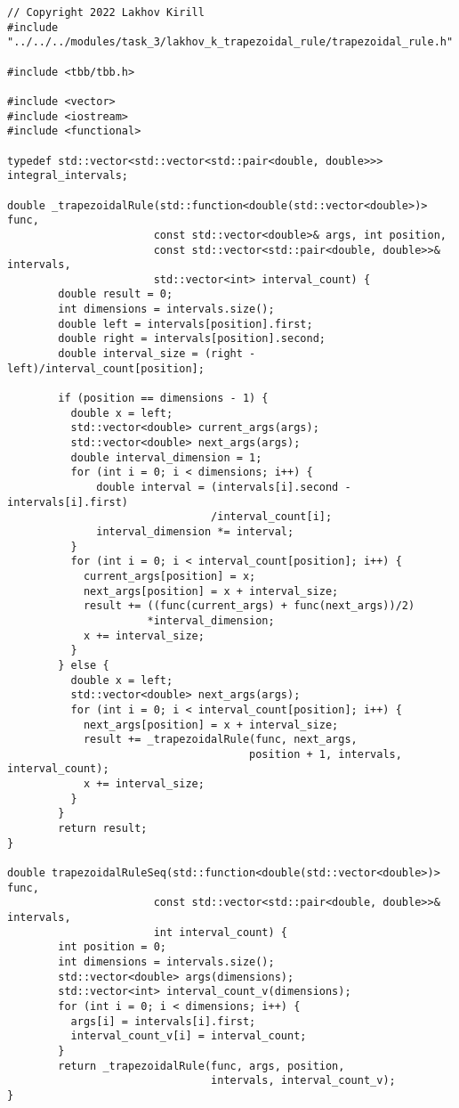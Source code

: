 \documentclass{report}
\begin{document}
\begin{lstlisting}
// Copyright 2022 Lakhov Kirill
#include "../../../modules/task_3/lakhov_k_trapezoidal_rule/trapezoidal_rule.h"

#include <tbb/tbb.h>

#include <vector>
#include <iostream>
#include <functional>

typedef std::vector<std::vector<std::pair<double, double>>> integral_intervals;

double _trapezoidalRule(std::function<double(std::vector<double>)> func,
                       const std::vector<double>& args, int position,
                       const std::vector<std::pair<double, double>>& intervals,
                       std::vector<int> interval_count) {
        double result = 0;
        int dimensions = intervals.size();
        double left = intervals[position].first;
        double right = intervals[position].second;
        double interval_size = (right - left)/interval_count[position];

        if (position == dimensions - 1) {
          double x = left;
          std::vector<double> current_args(args);
          std::vector<double> next_args(args);
          double interval_dimension = 1;
          for (int i = 0; i < dimensions; i++) {
              double interval = (intervals[i].second - intervals[i].first)
                                /interval_count[i];
              interval_dimension *= interval;
          }
          for (int i = 0; i < interval_count[position]; i++) {
            current_args[position] = x;
            next_args[position] = x + interval_size;
            result += ((func(current_args) + func(next_args))/2)
                      *interval_dimension;
            x += interval_size;
          }
        } else {
          double x = left;
          std::vector<double> next_args(args);
          for (int i = 0; i < interval_count[position]; i++) {
            next_args[position] = x + interval_size;
            result += _trapezoidalRule(func, next_args,
                                      position + 1, intervals, interval_count);
            x += interval_size;
          }
        }
        return result;
}

double trapezoidalRuleSeq(std::function<double(std::vector<double>)> func,
                       const std::vector<std::pair<double, double>>& intervals,
                       int interval_count) {
        int position = 0;
        int dimensions = intervals.size();
        std::vector<double> args(dimensions);
        std::vector<int> interval_count_v(dimensions);
        for (int i = 0; i < dimensions; i++) {
          args[i] = intervals[i].first;
          interval_count_v[i] = interval_count;
        }
        return _trapezoidalRule(func, args, position,
                                intervals, interval_count_v);
}


\end{lstlisting}
\end{document}
